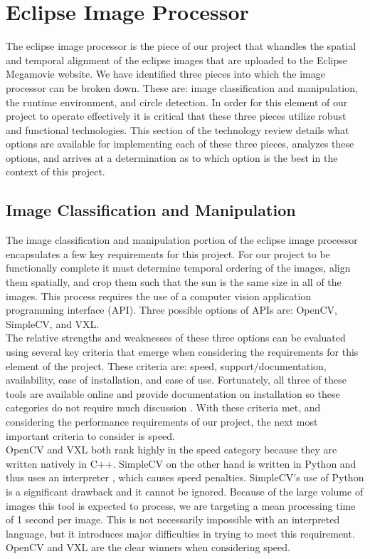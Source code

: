 \documentclass[10pt, onecolumn, draftclsnofoot, letterpaper, compsoc]{IEEEtran}
\begin{document}
\section{Eclipse Image Processor}

The eclipse image processor is the piece of our project that whandles the spatial
and temporal alignment of the eclipse images that are uploaded to the Eclipse
Megamovie website. We have identified three pieces into which
the image processor can be broken down. These are: image classification and
manipulation, the runtime environment, and circle detection. In order for this
element of our project to operate effectively it is critical that these three
pieces utilize robust and functional technologies. This section of the
technology review details what options are available for implementing each of
these three pieces, analyzes these options, and arrives at a determination as to
which option is the best in the context of this project.\\

\subsection{Image Classification and Manipulation}

The image classification and manipulation portion of the eclipse image processor
encapsulates a few key requirements for this project. For our project to be
functionally complete it must determine temporal ordering of the images, align
them spatially, and crop them such that the sun is the same size in all of the
images. This process requires the use of a computer vision application
programming interface (API). Three possible options of APIs are: OpenCV,
SimpleCV, and VXL. \\

The relative strengths and weaknesses of these three options can be evaluated
using several key criteria that emerge when considering the requirements for
this element of the project. These criteria are: speed, support/documentation,
availability, ease of installation, and ease of use. Fortunately, all three of
these tools are available online and provide documentation on installation so
these categories do not require much discussion \cite{OCV, VXL, SCV}. With these
criteria met, and considering the performance requirements of our project, the
next most important criteria to consider is speed. \\

OpenCV and VXL both rank highly in the speed category because they are written
natively in C++\cite{OCV, VXL}. SimpleCV on the other hand is written in Python
and thus uses an interpreter \cite{SCV}, which causes speed penalties.
SimpleCV's use of Python is a significant drawback and it cannot be ignored.
Because of the large volume of images this tool is expected to process, we are
targeting a mean processing time of 1 second per image. This is not necessarily
impossible with an interpreted language, but it introduces major difficulties in
trying to meet this requirement. OpenCV and VXL are the clear winners when
considering speed. \\
\end{document}
